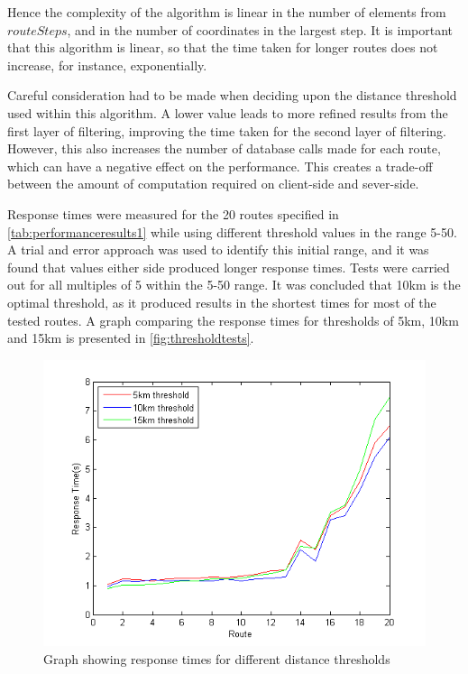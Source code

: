 \documentclass[authoryearcitations]{UoYCSproject}
\begin{document}
Hence the complexity of the algorithm is linear in the number of elements from $routeSteps$, and in the number of coordinates in the largest step. It is important that this algorithm is linear, so that the time taken for longer routes does not increase, for instance, exponentially.

Careful consideration had to be made when deciding upon the distance threshold used within this algorithm. A lower value leads to more refined results from the first layer of filtering, improving the time taken for the second layer of filtering. However, this also increases the number of database calls made for each route, which can have a negative effect on the performance. This creates a trade-off between the amount of computation required on client-side and sever-side. 

Response times were measured for the 20 routes specified in \autoref{tab:performanceresults1} while using different threshold values in the range 5-50. A trial and error approach was used to identify this initial range, and it was found that values either side produced longer response times. Tests were carried out for all multiples of 5 within the 5-50 range. It was concluded that 10km is the optimal threshold, as it produced results in the shortest times for most of the tested routes. A graph comparing the response times for thresholds of 5km, 10km and 15km is presented in \autoref{fig:thresholdtests}.

\begin{figure}
	\center
	\includegraphics[scale=1]{thresholdtests}
	\caption{Graph showing response times for different distance thresholds}
	\label{fig:thresholdtests}
\end{figure}
\end{document}
